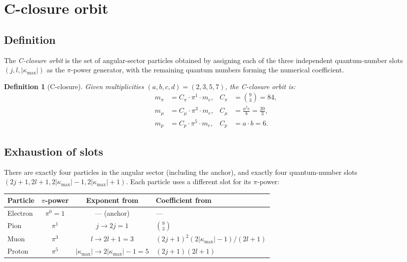 \documentclass[11pt,letterpaper]{article}
\newtheorem{definition}[theorem]{Definition}
\numberwithin{equation}{section}
\begin{document}
\section{C-closure orbit}
\label{sec:c_closure}

\subsection{Definition}

The \emph{C-closure orbit} is the set of angular-sector particles obtained
by assigning each of the three independent quantum-number slots
$(j, l, |\kappa_\mathrm{max}|)$ as the $\pi$-power generator, with the
remaining quantum numbers forming the numerical coefficient.

\begin{definition}[C-closure]
Given multiplicities $(a,b,c,d) = (2, 3, 5, 7)$, the C-closure orbit is:
\begin{align}
  m_\pi &= C_\pi \cdot \pi^1 \cdot m_e, & C_\pi &= \binom{9}{3} = 84, \label{eq:Cpi}\\
  m_\mu &= C_\mu \cdot \pi^3 \cdot m_e, & C_\mu &= \frac{a^2 c}{b} = \frac{20}{3}, \label{eq:Cmu}\\
  m_p   &= C_p \cdot \pi^5 \cdot m_e, & C_p &= a \cdot b = 6. \label{eq:Cp}
\end{align}
\end{definition}

\subsection{Exhaustion of slots}

There are exactly four particles in the angular sector (including the
anchor), and exactly four quantum-number slots $(2j+1, 2l+1, 2|\kappa_\mathrm{max}|-1, 2|\kappa_\mathrm{max}|+1)$. Each particle uses a different slot for its
$\pi$-power:

\begin{center}
\begin{tabular}{lccl}
\toprule
Particle & $\pi$-power & Exponent from & Coefficient from \\
\midrule
Electron & $\pi^0 = 1$ & --- (anchor) & --- \\
Pion     & $\pi^1$     & $j \to 2j = 1$ & $\binom{9}{3}$ \\
Muon     & $\pi^3$     & $l \to 2l+1 = 3$ & $(2j+1)^2(2|\kappa_\mathrm{max}|-1)/(2l+1)$ \\
Proton   & $\pi^5$     & $|\kappa_\mathrm{max}| \to 2|\kappa_\mathrm{max}|-1 = 5$ & $(2j+1)(2l+1)$ \\
\bottomrule
\end{tabular}
\end{center}
\end{document}
